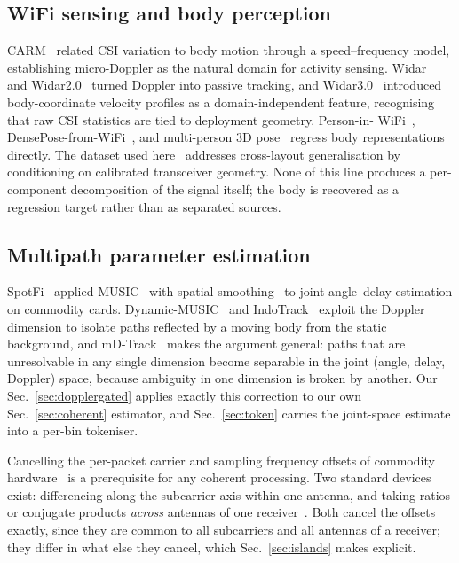 \documentclass[conference]{IEEEtran}
\begin{document}
\subsection{WiFi sensing and body perception}

CARM~\cite{wang2015carm} related CSI variation to body motion through a
speed--frequency model, establishing micro-Doppler as the natural domain for
activity sensing. Widar~\cite{qian2017widar} and Widar2.0~\cite{qian2018widar2}
turned Doppler into passive tracking, and Widar3.0~\cite{zheng2019widar3}
introduced body-coordinate velocity profiles as a domain-independent feature,
recognising that raw CSI statistics are tied to deployment geometry. Person-in-
WiFi~\cite{wang2019personinwifi}, DensePose-from-WiFi~\cite{geng2022densepose},
and multi-person 3D pose~\cite{yan2024personinwifi3d} regress body
representations directly. The dataset used here~\cite{perceptalign2026}
addresses cross-layout generalisation by conditioning on calibrated transceiver
geometry. None of this line produces a per-component decomposition of the
signal itself; the body is recovered as a regression target rather than as
separated sources.

\subsection{Multipath parameter estimation}

SpotFi~\cite{kotaru2015spotfi} applied MUSIC~\cite{schmidt1986music} with
spatial smoothing~\cite{shan1985smoothing} to joint angle--delay estimation on
commodity cards. Dynamic-MUSIC~\cite{li2016dynamicmusic} and
IndoTrack~\cite{li2017indotrack} exploit the Doppler dimension to isolate paths
reflected by a moving body from the static background, and
mD-Track~\cite{xie2019mdtrack} makes the argument general: paths that are
unresolvable in any single dimension become separable in the joint
(angle, delay, Doppler) space, because ambiguity in one dimension is broken by
another. Our Sec.~\ref{sec:dopplergated} applies exactly this correction to our
own Sec.~\ref{sec:coherent} estimator, and Sec.~\ref{sec:token} carries the
joint-space estimate into a per-bin tokeniser.

Cancelling the per-packet carrier and sampling frequency offsets of commodity
hardware~\cite{halperin2011tool} is a prerequisite for any coherent processing.
Two standard devices exist: differencing along the subcarrier axis within one
antenna, and taking ratios or conjugate products \emph{across} antennas of one
receiver~\cite{li2017indotrack,zeng2019farsense}. Both cancel the offsets
exactly, since they are common to all subcarriers and all antennas of a
receiver; they differ in what else they cancel, which Sec.~\ref{sec:islands}
makes explicit.
\end{document}
